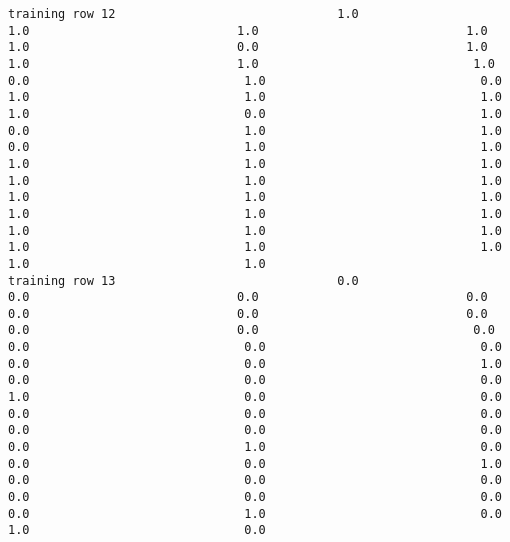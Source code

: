 \documentclass[11pt]{article}
\begin{document}
\begin{verbatim}
training row 12                               1.0                             1.0                             1.0                             1.0                             1.0                             0.0                             1.0                             1.0                             1.0                              1.0                              0.0                              1.0                              0.0                              1.0                              1.0                              1.0                              1.0                              0.0                              1.0                              0.0                              1.0                              1.0                              0.0                              1.0                              1.0                              1.0                              1.0                              1.0                              1.0                              1.0                              1.0                              1.0                              1.0                              1.0                              1.0                              1.0                              1.0                              1.0                              1.0                              1.0                              1.0                              1.0                              1.0                              1.0                              1.0
training row 13                               0.0                             0.0                             0.0                             0.0                             0.0                             0.0                             0.0                             0.0                             0.0                              0.0                              0.0                              0.0                              0.0                              0.0                              0.0                              1.0                              0.0                              0.0                              0.0                              1.0                              0.0                              0.0                              0.0                              0.0                              0.0                              0.0                              0.0                              0.0                              0.0                              1.0                              0.0                              0.0                              0.0                              1.0                              0.0                              0.0                              0.0                              0.0                              0.0                              0.0                              0.0                              1.0                              0.0                              1.0                              0.0

\end{verbatim}
\end{document}
